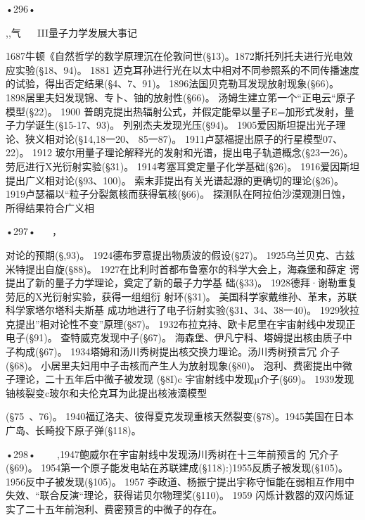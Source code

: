 •296•
 

,,气
  
III量子力学发展大事记

1687牛顿《自然哲学的数学原理沉在伦敦问世(§13)。1872斯托列托夫进行光电效应实验(§18、94)。
	1881	迈克耳孙进行光在以太中相对不同参照系的不同传播速度的试验，得出否定结果(§4、7、91)。
1896法国贝克勒耳发现放射现象(§66)。
1898居里夫妇发现锦、专卜、铀的放射性(§66)。
汤姆生建立笫一个“正电云“原子模型(§22)。
	1900	普朗克提出热辐射公式，并假定能晕以量子E=加形式发射，量子力学诞生(§15-17、93)。
列别杰夫发现光压(§94)。
1905爱因斯坦提出光子理论、狭义相对论(§14,18一20、
85一87)。
1911卢瑟福提出原子的行星模型07、22)。
	1912	玻尔用量子理论解释光的发射和光谱，提出电子轨道概念(§23一26)。
劳厄进行X光衍射实验(§31)。
1914考塞耳奠定量子化学基础(§26)。
1916爱因斯坦提出广义相对论(§93、100)。
索末菲提出有关光谱起源的更确切的理论(§26)。
1919卢瑟福以“粒子分裂氮核而获得氧核(§66)。
探测队在阿拉伯沙漠观测日蚀，所得结果符合广义相

•297•
  
，
 

对论的预期(§,93)。
1924德布罗意提出物质波的假设(§27)。
1925乌兰贝克、古兹米特提出自旋(§88)。
1927在比利时首都布鲁塞尔的科学大会上，海森堡和薛定
谔提出了新的量子力学理论，奠定了新的最子力学基
础(§33)。
1928德拜·谢勒重复劳厄的X光衍射实验，获得一组组衍
射环(§31)。
美国科学家戴维孙、革末，苏联科学家塔尔塔科夫斯基
成功地进行了电子衍射实验(§31、34、38一40)。
1929狄拉克提出”相对论性不变”原理(§87)。
1932布拉克持、欧卡尼里在宇宙射线中发现正电子(§91)。
查特威克发现中子(§67)。
海森堡、伊凡宁科、塔姆提出核由质子中子构成(§67)。
1934塔姆和汤川秀树提出核交换力理论。汤川秀树预言冗
介子(§68)。
小居里夫妇用中子击核而产生人为放射现象(§80)。
泡利、费密提出中微子理论，二十五年后中微子被发现
(§8I)c
宇宙射线中发现µ介子(§69)。
1939发现铀核裂变c玻尔和夫伦克耳为此提出核液滴模型

(§75~、76)。
1940福辽洛夫、彼得夏克发现重核天然裂变(§78)。1945美国在日本广岛、长畸投下原子弹(§118)。

•298•
  
~,1947鲍威尔在宇宙射线中发现汤川秀树在十三年前预言的
冗介子(§69)。
1954第一个原子能发电站在苏联建成(§118):)1955反质子被发现(§105)。
1956反中子被发现(§105)。
	1957	李政道、杨振宁提出宇称守恒能在弱相互作用中失效、“联合反演“理论，获得诺贝尔物理奖(§110)。
	1959	闪烁计数器的双闪烁证实了二十五年前泡利、费密预言的中微子的存在。

